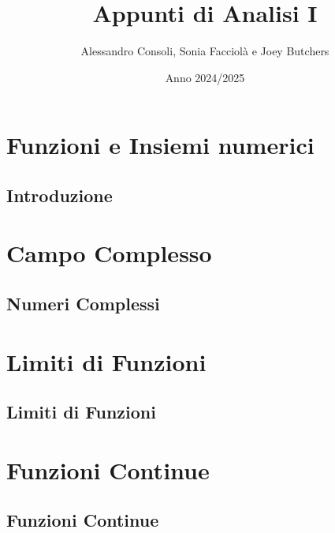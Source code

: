 \documentclass[a4paper,12pt]{report} %
\title{Appunti di Analisi I}
\author{Alessandro Consoli, Sonia Facciolà e Joey Butchers}
\date{Anno 2024/2025}
\begin{document}
    
    
    \tableofcontents


    \maketitle
    
\chapter{Funzioni e Insiemi numerici}

    \section{Introduzione}

    

\chapter{Campo Complesso}

    \section{Numeri Complessi}

    


\chapter{Limiti di Funzioni}

    \section{Limiti di Funzioni}

    



\chapter{Funzioni Continue}

    \section{Funzioni Continue}
    
    
    
\end{document}
